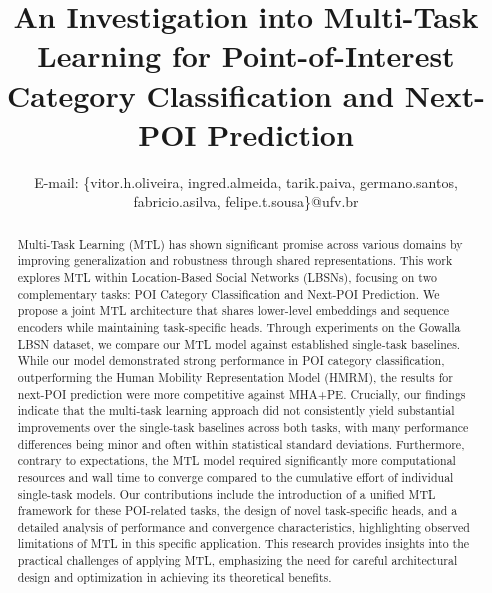 \documentclass[conference]{IEEEtran}
\begin{document}
\title{An Investigation into Multi-Task Learning for Point-of-Interest Category Classification and Next-POI Prediction  \\
}



\author{
E-mail: \{vitor.h.oliveira, ingred.almeida,  tarik.paiva, germano.santos, fabricio.asilva, felipe.t.sousa\}@ufv.br
}

\maketitle

\begin{abstract}
Multi-Task Learning (MTL) has shown significant promise across various domains by improving generalization and robustness through shared representations. This work explores MTL within Location-Based Social Networks (LBSNs), focusing on two complementary tasks: POI Category Classification and Next-POI Prediction. We propose a joint MTL architecture that shares lower-level embeddings and sequence encoders while maintaining task-specific heads. Through experiments on the Gowalla LBSN dataset, we compare our MTL model against established single-task baselines. While our model demonstrated strong performance in POI category classification, outperforming the Human Mobility Representation Model (HMRM), the results for next-POI prediction were more competitive against MHA+PE. Crucially, our findings indicate that the multi-task learning approach did not consistently yield substantial improvements over the single-task baselines across both tasks, with many performance differences being minor and often within statistical standard deviations. Furthermore, contrary to expectations, the MTL model required significantly more computational resources and wall time to converge compared to the cumulative effort of individual single-task models. Our contributions include the introduction of a unified MTL framework for these POI-related tasks, the design of novel task-specific heads, and a detailed analysis of performance and convergence characteristics, highlighting observed limitations of MTL in this specific application. This research provides insights into the practical challenges of applying MTL, emphasizing the need for careful architectural design and optimization in achieving its theoretical benefits.
\end{abstract}
\end{document}
